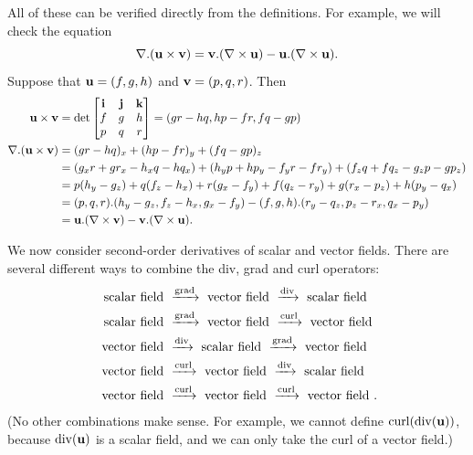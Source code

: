 \documentclass[reqno]{amsart}
\theoremstyle{definition}
\begin{document}
All of these can be verified directly from the definitions.  For
example, we will check the equation
\[ \nabla.(\mathbf{u}\times\mathbf{v}) = \mathbf{v}.(\nabla\times\mathbf{u}) - \mathbf{u}.(\nabla\times\mathbf{u}). \]
Suppose that $\mathbf{u}=(f,g,h)$ and $\mathbf{v}=(p,q,r)$.  Then 
\begin{align*}
 \mathbf{u}\times\mathbf{v} &= \det\left[\begin{matrix} \mathbf{i} & \mathbf{j} & \mathbf{k} \\
                       f   & g   & h   \\
                       p   & q   & r   \end{matrix}\right] 
            = (gr-hq,hp-fr,fq-gp) \\
 \nabla.(\mathbf{u}\times\mathbf{v}) &=
  (gr-hq)_x + (hp-fr)_y + (fq-gp)_z \\
  &= (g_xr+gr_x-h_xq-hq_x) +
     (h_yp+hp_y-f_yr-fr_y) +
     (f_zq+fq_z-g_zp-gp_z) \\
  &= p(h_y-g_z) + q(f_z-h_x) + r(g_x-f_y) +
     f(q_z-r_y) + g(r_x-p_z) + h(p_y-q_x) \\
  &= (p,q,r).(h_y-g_z,f_z-h_x,g_x-f_y) -  
     (f,g,h).(r_y-q_z,p_z-r_x,q_x-p_y) \\
  &= \mathbf{u}.(\nabla\times\mathbf{v}) - \mathbf{v}.(\nabla\times\mathbf{u}).
\end{align*}

We now consider second-order derivatives of scalar and vector fields.
There are several different ways to combine the div, grad and curl
operators: 
{\def\SF{\text{ scalar field }} \def\VF{\text{ vector field }}
\begin{align*}
 \SF &\xra{\grad} \VF \xra{\dv} \SF \\
 \SF &\xra{\grad} \VF \xra{\curl} \VF \\
 \VF &\xra{\dv} \SF \xra{\grad} \VF \\
 \VF &\xra{\curl} \VF \xra{\dv} \SF \\
 \VF &\xra{\curl} \VF \xra{\curl} \VF.
\end{align*}}
(No other combinations make sense.  For example, we cannot define
$\operatorname{curl}(\operatorname{div}(\mathbf{u}))$, because $\operatorname{div}(\mathbf{u})$ is a scalar field, and we can
only take the curl of a vector field.)
\end{document}
